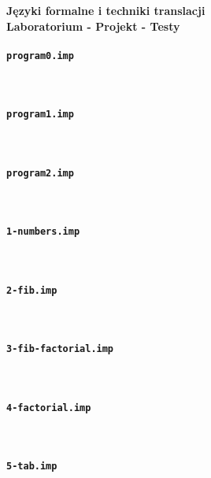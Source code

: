 \documentclass[12pt,a4paper]{article}
\begin{document}
\begin{center}
{\Large\bf Języki formalne i techniki translacji}\\
{\large\bf Laboratorium - Projekt - Testy}
\end{center}


\paragraph{\tt program0.imp} \



\paragraph{\tt program1.imp} \



\paragraph{\tt program2.imp} \



\paragraph{\tt 1-numbers.imp} \



\paragraph{\tt 2-fib.imp} \



\paragraph{\tt 3-fib-factorial.imp} \



\paragraph{\tt 4-factorial.imp} \



\paragraph{\tt 5-tab.imp} \
\end{document}
